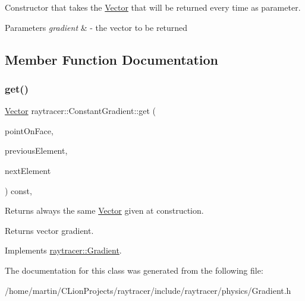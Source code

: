 Constructor that takes the \hyperlink{classraytracer_1_1Vector}{Vector} that will be returned every time as parameter. 


\begin{DoxyParams}{Parameters}
{\em gradient} & -\/ the vector to be returned \\
\hline
\end{DoxyParams}


\subsection{Member Function Documentation}
\mbox{\label{classraytracer_1_1ConstantGradient_afd5e248b930551c0ad1bf84482b930b9}} 
\subsubsection{\texorpdfstring{get()}{get()}}
{\footnotesize\ttfamily \hyperlink{classraytracer_1_1Vector}{Vector} raytracer\+::\+Constant\+Gradient\+::get (\begin{DoxyParamCaption}\item[{const \hyperlink{structraytracer_1_1PointOnFace}{Point\+On\+Face} \&}]{point\+On\+Face,  }\item[{const \hyperlink{classraytracer_1_1Element}{Element} \&}]{previous\+Element,  }\item[{const \hyperlink{classraytracer_1_1Element}{Element} \&}]{next\+Element }\end{DoxyParamCaption}) const\hspace{0.3cm}{\ttfamily [override]}, {\ttfamily [virtual]}}



Returns always the same \hyperlink{classraytracer_1_1Vector}{Vector} given at construction. 

\begin{DoxyReturn}{Returns}
vector gradient. 
\end{DoxyReturn}


Implements \hyperlink{classraytracer_1_1Gradient_a93ccfef0662634c5f9a3c8dd04e73496}{raytracer\+::\+Gradient}.



The documentation for this class was generated from the following file\+:\begin{DoxyCompactItemize}
\item 
/home/martin/\+C\+Lion\+Projects/raytracer/include/raytracer/physics/Gradient.\+h\end{DoxyCompactItemize}

